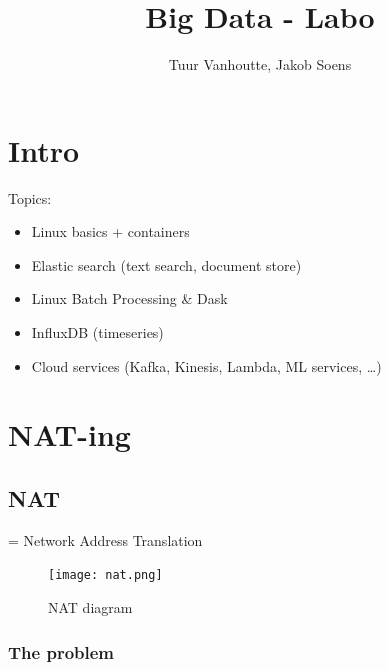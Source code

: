 \documentclass{article}
\begin{document}
\begin{titlepage}
    \author{Tuur Vanhoutte, Jakob Soens}
    \title{Big Data - Labo}
\end{titlepage}

\maketitle
\newpage
\tableofcontents
\newpage


\section{Intro}

Topics:

\begin{itemize}
    \item Linux basics + containers
    \item Elastic search (text search, document store)
    \item Linux Batch Processing \& Dask
    \item InfluxDB (timeseries)
    \item Cloud services (Kafka, Kinesis, Lambda, ML services, \dots)
\end{itemize}

\section{NAT-ing}

\subsection{NAT}

= Network Address Translation

\begin{figure}[H]
    \centering
    \texttt{[image: nat.png]}
    \caption{NAT diagram}
\end{figure}

\subsubsection{The problem}
\end{document}
